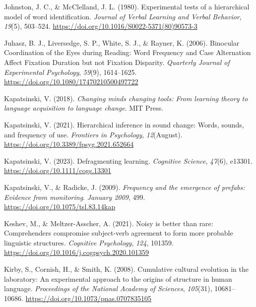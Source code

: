 \documentclass[
  12pt,
  letterpaper,
]{scrreport}
\newlength{\cslhangindent}
\newenvironment{CSLReferences}[2] %
 {\begin{list}{}{%
  \setlength{\itemindent}{0pt}
  \setlength{\leftmargin}{0pt}
  \setlength{\parsep}{0pt}
  \ifodd #1
   \setlength{\leftmargin}{\cslhangindent}
   \setlength{\itemindent}{-1\cslhangindent}
  \fi
  \setlength{\itemsep}{#2\baselineskip}}}
 {\end{list}}
\begin{document}
\begin{CSLReferences}{1}{0}
Johnston, J. C., \& McClelland, J. L. (1980). Experimental tests of a
hierarchical model of word identification. \emph{Journal of Verbal
Learning and Verbal Behavior}, \emph{19}(5), 503--524.
\url{https://doi.org/10.1016/S0022-5371(80)90573-3}

Juhasz, B. J., Liversedge, S. P., White, S. J., \& Rayner, K. (2006).
Binocular Coordination of the Eyes during Reading: Word Frequency and
Case Alternation Affect Fixation Duration but not Fixation Disparity.
\emph{Quarterly Journal of Experimental Psychology}, \emph{59}(9),
1614--1625. \url{https://doi.org/10.1080/17470210500497722}

Kapatsinski, V. (2018). \emph{Changing minds changing tools: From
learning theory to language acquisition to language change}. MIT Press.

Kapatsinski, V. (2021). Hierarchical inference in sound change: Words,
sounds, and frequency of use. \emph{Frontiers in Psychology},
\emph{12}(August). \url{https://doi.org/10.3389/fpsyg.2021.652664}

Kapatsinski, V. (2023). Defragmenting learning. \emph{Cognitive
Science}, \emph{47}(6), e13301. \url{https://doi.org/10.1111/cogs.13301}

Kapatsinski, V., \& Radicke, J. (2009). \emph{Frequency and the
emergence of prefabs: Evidence from monitoring}. \emph{January 2009},
499. \url{https://doi.org/10.1075/tsl.83.14kap}

Keshev, M., \& Meltzer-Asscher, A. (2021). Noisy is better than rare:
Comprehenders compromise subject-verb agreement to form more probable
linguistic structures. \emph{Cognitive Psychology}, \emph{124}, 101359.
\url{https://doi.org/10.1016/j.cogpsych.2020.101359}

Kirby, S., Cornish, H., \& Smith, K. (2008). Cumulative cultural
evolution in the laboratory: An experimental approach to the origins of
structure in human language. \emph{Proceedings of the National Academy
of Sciences}, \emph{105}(31), 10681--10686.
\url{https://doi.org/10.1073/pnas.0707835105}


\end{CSLReferences}
\end{document}
